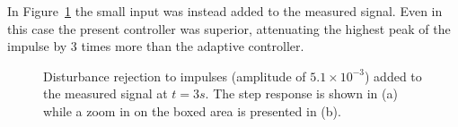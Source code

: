In Figure~\ref{fig:distmeasrejection} the small input was instead added to the measured signal. Even in this case the present controller was superior, attenuating the highest peak of the impulse by 3 times more than the adaptive controller.

\begin{figure}[h!]
  \centering %
  \qquad
  \caption{\label{fig:distmeasrejection} Disturbance rejection to impulses (amplitude of $5.1 \times 10^{-3}$) added to the measured signal at $t=3s$. The step response is shown in (a) while a zoom in on the boxed area is presented in (b).}
\end{figure}

\newpage
